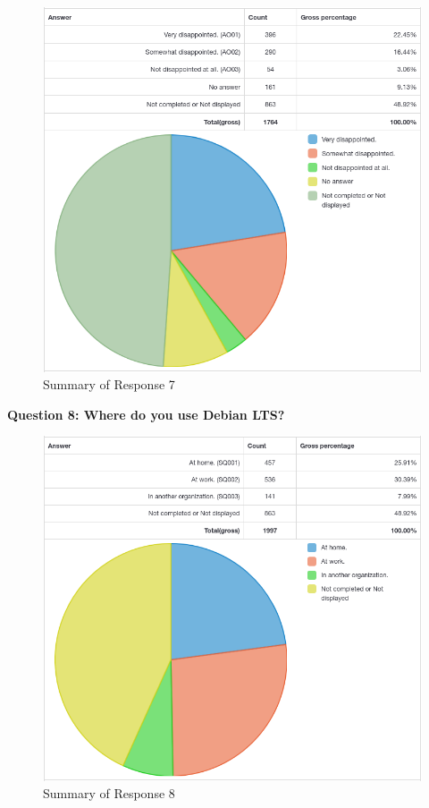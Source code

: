 \documentclass{article}
\begin{document}
\vspace{3mm}
\begin{figure}[h!]
\centering
\includegraphics[width=16.5cm]{assets/7-summary.png}
\caption{Summary of Response 7}
\end{figure}

\newpage

\Large{\textbf{Question 8: Where do you use Debian LTS?}}

\vspace{3mm}
\begin{figure}[h!]
\centering
\includegraphics[width=16.5cm]{assets/8-summary.png}
\caption{Summary of Response 8}
\end{figure}
\end{document}
